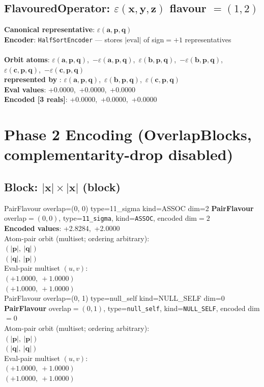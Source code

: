 \documentclass[a4paper,11pt]{article}
\newcommand{\vc}[1]{\ensuremath{\mathbf{#1}}}
\newcommand{\dnfagmiihhiejm}[1]{|\vc{#1}|}
\newcommand{\kblbmcpggoncpf}[3]{\varepsilon(\mathbf{#1},\mathbf{#2},\mathbf{#3})}
\begin{document}
\subsection{FlavouredOperator: $\kblbmcpggoncpf{x}{y}{z}$  flavour $= (1, 2)$}
\textbf{  Canonical representative}: $\displaystyle\kblbmcpggoncpf{a}{p}{q}$\\
\textbf{  Encoder}: \texttt{HalfSortEncoder} — stores $|\text{eval}|$ of sign$=+1$ representatives\\\\
\textbf{  Orbit atoms}: $\kblbmcpggoncpf{a}{p}{q}$,\ $-\kblbmcpggoncpf{a}{p}{q}$,\ $\kblbmcpggoncpf{b}{p}{q}$,\ $-\kblbmcpggoncpf{b}{p}{q}$,\ $\kblbmcpggoncpf{c}{p}{q}$,\ $-\kblbmcpggoncpf{c}{p}{q}$\\
\textbf{  represented by }: $\kblbmcpggoncpf{a}{p}{q}$,\ $\kblbmcpggoncpf{b}{p}{q}$,\ $\kblbmcpggoncpf{c}{p}{q}$\\
\textbf{  Eval values}: +0.0000,\ +0.0000,\ +0.0000\\
\textbf{  Encoded [3 reals]}: +0.0000,\ +0.0000,\ +0.0000\\

\section{Phase 2 Encoding  (OverlapBlocks, complementarity-drop disabled)}

\subsection{Block: $\dnfagmiihhiejm{x} \times \dnfagmiihhiejm{x}$  (block)}
    PairFlavour  overlap=(0, 0)  type=11\_sigma  kind=ASSOC  dim=2
\textbf{PairFlavour} overlap$=(0, 0)$, type=\texttt{11\_sigma}, kind=\texttt{ASSOC}, encoded dim$=2$\\
\textbf{      Encoded values}: +2.8284,\ +2.0000\\
\quad Atom-pair orbit (multiset; ordering arbitrary):\\
$(\dnfagmiihhiejm{p},\ \dnfagmiihhiejm{q})$\\
$(\dnfagmiihhiejm{q},\ \dnfagmiihhiejm{p})$\\
\quad Eval-pair multiset $(u, v)$:\\
$(+1.0000,\ +1.0000)$\\
$(+1.0000,\ +1.0000)$\\
    PairFlavour  overlap=(0, 1)  type=null\_self  kind=NULL\_SELF  dim=0
\textbf{PairFlavour} overlap$=(0, 1)$, type=\texttt{null\_self}, kind=\texttt{NULL\_SELF}, encoded dim$=0$\\
\quad Atom-pair orbit (multiset; ordering arbitrary):\\
$(\dnfagmiihhiejm{p},\ \dnfagmiihhiejm{p})$\\
$(\dnfagmiihhiejm{q},\ \dnfagmiihhiejm{q})$\\
\quad Eval-pair multiset $(u, v)$:\\
$(+1.0000,\ +1.0000)$\\
$(+1.0000,\ +1.0000)$\\
\end{document}

